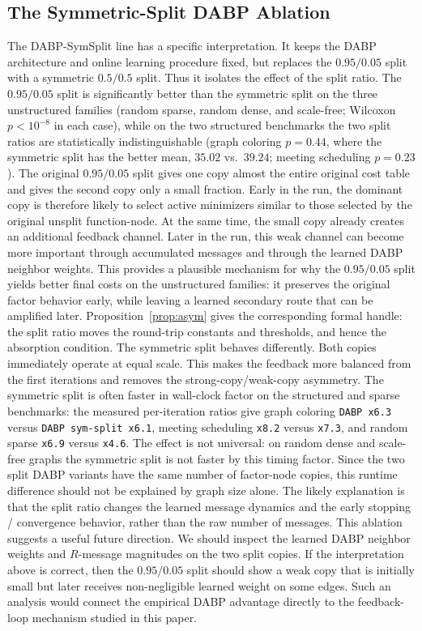 \documentclass[letterpaper]{article} %
\theoremstyle{definition}
\theoremstyle{remark}
\begin{document}
\subsection{The Symmetric-Split DABP Ablation}
The DABP-SymSplit line has a specific interpretation.  It keeps the DABP
architecture and online learning procedure fixed, but replaces the $0.95/0.05$
split with a symmetric $0.5/0.5$ split.  Thus it isolates the effect of the split
ratio.
The $0.95/0.05$ split is significantly better than the symmetric split on the
three unstructured families (random sparse, random dense, and scale-free;
Wilcoxon $p < 10^{-8}$ in each case), while on the two structured benchmarks
the two split ratios are statistically indistinguishable (graph coloring
$p = 0.44$, where the symmetric split has the better mean, $35.02$ vs.\
$39.24$; meeting scheduling $p = 0.23$).
The original $0.95/0.05$ split gives one copy almost the entire original cost
table and gives the second copy only a small fraction.  Early in the run, the
dominant copy is therefore likely to select active minimizers similar to those
selected by the original unsplit function-node.  At the same time, the small
copy already creates an additional feedback channel.  Later in the run, this
weak channel can become more important through accumulated messages and
through the learned DABP neighbor weights.  This provides a plausible mechanism
for why the $0.95/0.05$ split yields better final costs on the unstructured
families: it preserves the original factor behavior early, while leaving a
learned secondary route that can be amplified later.  Proposition~\ref{prop:asym}
gives the corresponding formal handle: the split ratio moves the round-trip
constants and thresholds, and hence the absorption condition.
The symmetric split behaves differently.  Both copies immediately operate at
equal scale.  This makes the feedback more balanced from the first iterations
and removes the strong-copy/weak-copy asymmetry.  The symmetric split is
often faster in wall-clock factor on the structured and sparse benchmarks: the
measured per-iteration ratios give graph coloring \texttt{DABP x6.3} versus
\texttt{DABP sym-split x6.1}, meeting scheduling \texttt{x8.2} versus
\texttt{x7.3}, and random sparse \texttt{x6.9} versus \texttt{x4.6}.  The
effect is not universal: on random dense and scale-free graphs the symmetric
split is not faster by this timing factor.  Since the two split DABP variants
have the same number of factor-node copies, this runtime difference should not
be explained by graph size alone.  The likely explanation is that the split
ratio changes the learned message dynamics and the early stopping / convergence
behavior, rather than the raw number of messages.
This ablation suggests a useful future direction.  We should inspect the learned
DABP neighbor weights and $R$-message magnitudes on the two split copies.  If
the interpretation above is correct, then the $0.95/0.05$ split should show a
weak copy that is initially small but later receives non-negligible learned
weight on some edges.  Such an analysis would connect the empirical DABP
advantage directly to the feedback-loop mechanism studied in this paper.
\end{document}
